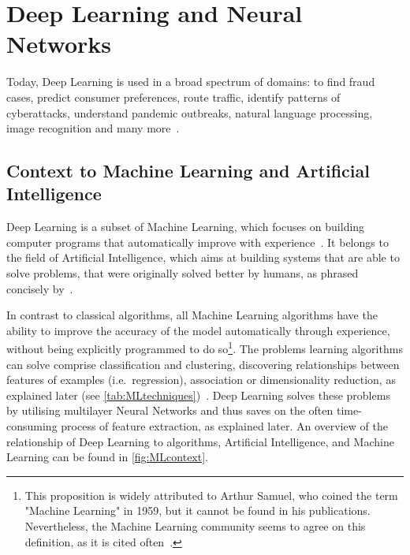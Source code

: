 \section{Deep Learning and Neural Networks} \label{sec:deep-learning-and-neural-networks}
Today, Deep Learning is used in a broad spectrum of domains: to find fraud cases, predict consumer preferences, route traffic, identify patterns of cyberattacks, understand pandemic outbreaks, natural language processing, image recognition and many more~\autocite{Sarker2021}.

\subsection{Context to Machine Learning and Artificial Intelligence}\label{subsec:context-to-machine-learning-and-artificial-intelligence}
Deep Learning is a subset of Machine Learning, which focuses on building computer programs that automatically improve with experience~\autocite{Mitchell1997}. %
It belongs to the field of Artificial Intelligence, which aims at building systems that are able to solve problems, that were originally solved better by humans, as phrased concisely by~\textcite{Rich1983}. %

In contrast to classical algorithms, all Machine Learning algorithms have the ability to improve the accuracy of the model automatically through experience, without being explicitly programmed to do so\footnote{This proposition is widely attributed to Arthur Samuel, who coined the term "Machine Learning" in 1959, but it cannot be found in his publications. Nevertheless, the Machine Learning community seems to agree on this definition, as it is cited often~\autocite[e.g.][]{Sarker2021}.}. %
The problems learning algorithms can solve comprise classification and clustering, discovering relationships between features of examples (i.e.\ regression), association or dimensionality reduction, as explained later (see \autoref{tab:MLtechniques})~\autocite{Sarker2021}.
Deep Learning solves these problems by utilising multilayer Neural Networks and thus saves on the often time-consuming process of feature extraction, as explained later.
An overview of the relationship of Deep Learning to algorithms, Artificial Intelligence, and Machine Learning can be found in \autoref{fig:MLcontext}.

